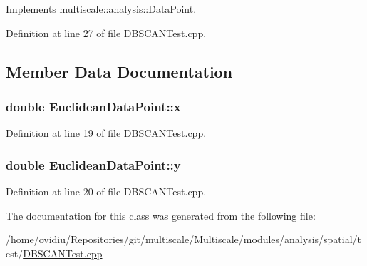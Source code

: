 \-Implements \hyperlink{classmultiscale_1_1analysis_1_1DataPoint_a8dd5def96eab756085461e8f6a201dce}{multiscale\-::analysis\-::\-Data\-Point}.



\-Definition at line 27 of file \-D\-B\-S\-C\-A\-N\-Test.\-cpp.



\subsection{\-Member \-Data \-Documentation}
\hypertarget{classEuclideanDataPoint_a7d3a3555621c6fd195f2f0543e04eaf6}{
\subsubsection[{x}]{\setlength{\rightskip}{0pt plus 5cm}double {\bf \-Euclidean\-Data\-Point\-::x}}}\label{classEuclideanDataPoint_a7d3a3555621c6fd195f2f0543e04eaf6}


\-Definition at line 19 of file \-D\-B\-S\-C\-A\-N\-Test.\-cpp.

\hypertarget{classEuclideanDataPoint_a108d29336be8bf0bd1aa53c40df3bd68}{
\subsubsection[{y}]{\setlength{\rightskip}{0pt plus 5cm}double {\bf \-Euclidean\-Data\-Point\-::y}}}\label{classEuclideanDataPoint_a108d29336be8bf0bd1aa53c40df3bd68}


\-Definition at line 20 of file \-D\-B\-S\-C\-A\-N\-Test.\-cpp.



\-The documentation for this class was generated from the following file\-:\begin{DoxyCompactItemize}
\item 
/home/ovidiu/\-Repositories/git/multiscale/\-Multiscale/modules/analysis/spatial/test/\hyperlink{DBSCANTest_8cpp}{\-D\-B\-S\-C\-A\-N\-Test.\-cpp}\end{DoxyCompactItemize}
